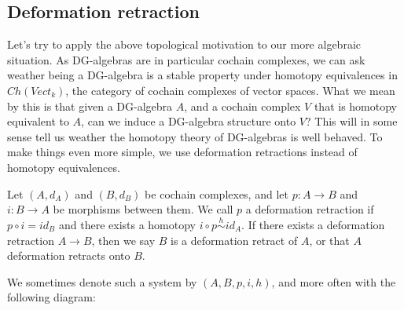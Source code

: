 

\subsection{Deformation retraction}



Let's try to apply the above topological motivation to our more algebraic situation. As DG-algebras are in particular cochain complexes, we can ask weather being a DG-algebra is a stable property under homotopy equivalences in $Ch(Vect_k)$, the category of cochain complexes of vector spaces. What we mean by this is that given a DG-algebra $A$, and a cochain complex $V$ that is homotopy equivalent to $A$, can we induce a DG-algebra structure onto $V$? This will in some sense tell us weather the homotopy theory of DG-algebras is well behaved. To make things even more simple, we use deformation retractions instead of homotopy equivalences. 

\begin{definition}
\label{def:deformation_retraction}
Let $(A, d_A)$ and $(B, d_B)$ be cochain complexes, and let $p:A\longrightarrow B$ and $i:B\longrightarrow A$ be morphisms between them. We call $p$ a deformation retraction if $p\circ i = id_B$ and there exists a homotopy $i\circ p\overset{h}\sim id_A$. If there exists a deformation retraction $A\longrightarrow B$, then we say $B$ is a deformation retract of $A$, or that $A$ deformation retracts onto $B$.

We sometimes denote such a system by $(A, B, p, i, h)$, and more often with the following diagram:
\begin{center}
\end{center}
\end{definition}

